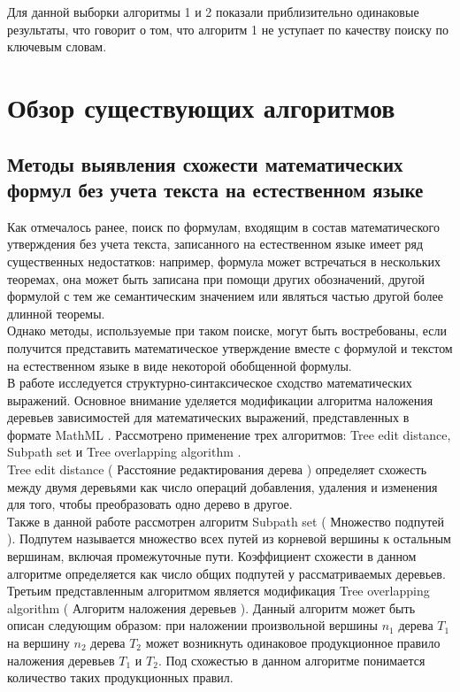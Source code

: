 \documentclass[12pt]{article}
\begin{document}
Для данной выборки алгоритмы 1 и 2 показали приблизительно одинаковые результаты, что говорит о том, что алгоритм 1 не уступает по качеству поиску по ключевым словам.

\newpage
\section{Обзор существующих алгоритмов}
\subsection{Методы выявления схожести математических формул без учета текста на естественном языке}
Как отмечалось ранее, поиск по формулам, входящим в состав математического утверждения без учета текста, записанного на естественном языке имеет ряд существенных недостатков: например, формула может встречаться в нескольких теоремах, она может быть записана при помощи других обозначений, другой формулой с тем же семантическим значением или являться частью другой более длинной теоремы. \\

Однако методы, используемые при таком поиске, могут быть востребованы, если получится представить математическое утверждение вместе с формулой  и текстом на естественном языке в виде некоторой обобщенной формулы.  \\

В работе \cite{Pyshkin} исследуется структурно-синтаксическое сходство математических выражений. Основное внимание уделяется модификации алгоритма наложения деревьев зависимостей для математических выражений, представленных в формате MathML . Рассмотрено применение трех алгоритмов: Tree edit distance, Subpath set и Tree overlapping algorithm .  \\

Tree edit distance ( Расстояние редактирования дерева ) определяет схожесть между двумя деревьями как число операций добавления, удаления и изменения для того, чтобы преобразовать одно дерево в другое. \\

Также в данной работе рассмотрен алгоритм Subpath set ( Множество подпутей ). Подпутем называется множество всех путей из корневой вершины к остальным вершинам, включая промежуточные пути. Коэффициент схожести в данном алгоритме определяется как число общих подпутей у рассматриваемых деревьев. \\

Третьим представленным алгоритмом является  модификация Tree overlapping algorithm ( Алгоритм наложения деревьев ). Данный алгоритм может быть описан следующим образом: при наложении произвольной вершины $n_1$ дерева $T_1$  на вершину $n_2$ дерева $T_2$ может возникнуть одинаковое продукционное правило наложения деревьев $T_1$ и $T_2$. Под схожестью в данном алгоритме понимается количество таких продукционных правил. \\
\end{document}
